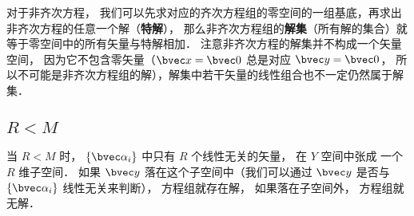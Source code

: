 对于非齐次方程， 我们可以先求对应的齐次方程组的零空间的一组基底，再求出非齐次方程的任意一个解（\textbf{特解}）， 那么非齐次方程组的\textbf{解集}（所有解的集合）就等于零空间中的所有矢量与特解相加． 注意非齐次方程的解集并不构成一个矢量空间， 因为它不包含零矢量（$\bvec x = \bvec 0$ 总是对应 $\bvec y = \bvec 0$， 所以不可能是非齐次方程组的解），解集中若干矢量的线性组合也不一定仍然属于解集．

\subsection{$R < M$}
当 $R < M$ 时， $\{\bvec \alpha_i\}$ 中只有 $R$ 个线性无关的矢量， 在 $Y$ 空间中张成%
一个 $R$ 维子空间． 如果 $\bvec y$ 落在这个子空间中（我们可以通过 $\bvec y$ 是否与 $\{\bvec \alpha_i\}$ 线性无关来判断）， 方程组就存在解， 如果落在子空间外， 方程组就无解．

